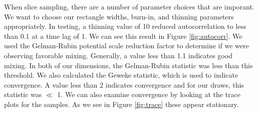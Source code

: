 \documentclass{article} %
\begin{document}
When slice sampling, there are a number of parameter choices that are imporant. We want to choose our rectangle widths, burn-in, and thinning parameters appropriately. In testing, a thinning value of 10 reduced autocorrelation to less than 0.1 at a time lag of 1. We can see this result in Figure \ref{fig:autocorr}. We used the Gelman-Rubin potential scale reduction factor\cite{Gelman-Rubin} to determine if we were observing favorable mixing. Generally, a value less than 1.1 indicates good mixing. In both of our dimensions, the Gelman-Rubin statistic was less than this threshold. We also calculated the Geweke statistic, which is used to indicate convergence. A value less than 2 indicates convergence and for our draws, this statistic was $\ll$ 1. We can also examine convergence by looking at the trace plots for the samples. As we see in Figure \ref{fig:trace} these appear stationary.
\end{document}

